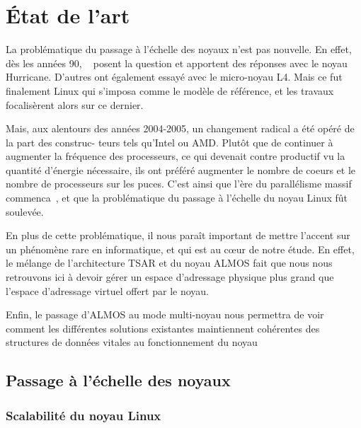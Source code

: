 \section{État de l’art}

  La problématique du passage à l’échelle des noyaux n’est pas nouvelle. En
  effet, dès les années 90, ~\citeauthor{unrau1995hierarchical} posent la
  question et apportent des réponses avec le noyau Hurricane. D’autres ont
  également essayé avec le micro-noyau L4. Mais ce fut finalement Linux qui
  s’imposa comme le modèle de référence, et les travaux focalisèrent alors sur
  ce dernier.

  Mais, aux alentours des années 2004-2005, un changement radical a été opéré de
  la part des construc- teurs tels qu’Intel ou AMD. Plutôt que de continuer à
  augmenter la fréquence des processeurs, ce qui devenait contre productif vu la
  quantité d’énergie nécessaire, ils ont préféré augmenter le nombre de coeurs
  et le nombre de processeurs sur les puces. C’est ainsi que l’ère du
  parallélisme massif commenca~\citep{patterson2011parallel}, et que la
  problématique du passage à l’échelle du noyau Linux fût soulevée.

  En plus de cette problématique, il nous paraît important de mettre l’accent
  sur un phénomène rare en informatique, et qui est au c\oe ur de notre
  étude. En effet, le mélange de l’architecture TSAR et du noyau ALMOS fait que
  nous nous retrouvons ici à devoir gérer un espace d’adressage physique plus
  grand que l’espace d’adressage virtuel offert par le noyau.

  Enfin, le passage d’ALMOS au mode multi-noyau nous permettra de voir comment
  les différentes solutions existantes maintiennent cohérentes des structures de
  données vitales au fonctionnement du noyau


  \subsection{Passage à l’échelle des noyaux}
  \label{sec:scalability}

    \subsubsection{Scalabilité du noyau Linux}

